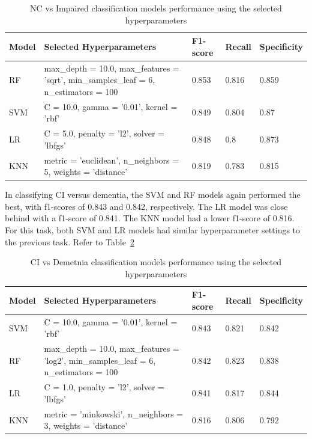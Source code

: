 \begin{table}[!ht]
    \centering
    \caption{NC vs Impaired classification models performance using the selected hyperparameters}
    \begin{tabular}{|l|p{5cm}|l|l|l|}
    \hline
        Model & Selected Hyperparameters & F1-score & Recall & Specificity \\ \hline
        RF & max\_depth = 10.0, max\_features = 'sqrt', min\_samples\_leaf = 6, n\_estimators = 100 & 0.853 & 0.816 & 0.859 \\ \hline
        SVM & C = 10.0, gamma = '0.01', kernel = 'rbf' & 0.849 & 0.804 & 0.87 \\ \hline
        LR & C = 5.0, penalty = 'l2', solver = 'lbfgs' & 0.848 & 0.8 & 0.873 \\ \hline
        KNN & metric = 'euclidean', n\_neighbors = 5, weights = 'distance' & 0.819 & 0.783 & 0.815 \\ \hline
    \end{tabular}
    \label{table:hyperparameter-resutls-task1}
\end{table}

In classifying CI versus dementia, the SVM and RF models again performed the best, with f1-scores of 0.843 and 0.842, respectively. The LR model was close behind with a f1-score of 0.841. The KNN model had a lower f1-score of 0.816. For this task, both SVM and LR models had similar hyperparameter settings to the previous task. Refer to Table~\ref{table:hyperparameter-resutls-task2}

\begin{table}[!ht]
    \centering
    \caption{CI vs Demetnia classification models performance using the selected hyperparameters}
    \begin{tabular}{|l|p{5cm}|l|l|l|}
    \hline
        Model & Selected Hyperparameters & F1-score & Recall & Specificity \\ \hline
        SVM & C = 10.0, gamma = '0.01', kernel = 'rbf' & 0.843 & 0.821 & 0.842 \\ \hline
        RF & max\_depth = 10.0, max\_features = 'log2', min\_samples\_leaf = 6, n\_estimators = 100 & 0.842 & 0.823 & 0.838 \\ \hline
        LR & C = 1.0, penalty = 'l2', solver = 'lbfgs' & 0.841 & 0.817 & 0.844 \\ \hline
        KNN & metric = 'minkowski', n\_neighbors = 3, weights = 'distance' & 0.816 & 0.806 & 0.792 \\ \hline
    \end{tabular}
    \label{table:hyperparameter-resutls-task2}
\end{table}

